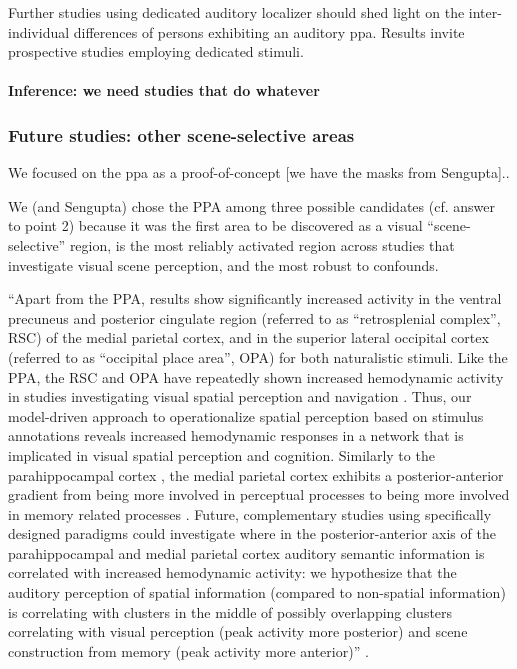 %
Further studies using dedicated auditory localizer should shed light on the
inter-individual differences of persons exhibiting an auditory \ac{ppa}.
%
Results invite prospective studies employing dedicated stimuli.



\paragraph{Inference: we need studies that do whatever}




\subsubsection{Future studies: other scene-selective areas}


We focused on the \ac{ppa} as a proof-of-concept [we have the masks from
Sengupta]..

%
We (and Sengupta) chose the PPA among three possible candidates (cf. answer to
point 2) because it was the first area to be discovered as a visual
“scene-selective” region, is the most reliably activated region across studies
that investigate visual scene perception, and the most robust to confounds.

``Apart from the PPA, results show significantly increased activity in the
ventral precuneus and posterior cingulate region (referred to as ``retrosplenial
complex'', RSC) of the medial parietal cortex, and in the superior lateral
occipital cortex (referred to as ``occipital place area'', OPA) for both
naturalistic stimuli.
Like the PPA, the RSC and OPA have repeatedly shown increased hemodynamic
activity in studies investigating visual spatial perception and navigation
\citep{chrastil2018heterogeneity, bettencourt2013role, dilks2013occipital,
epstein2019scene}.
Thus, our model-driven approach to operationalize spatial perception based on
stimulus annotations reveals increased hemodynamic responses in a network that
is implicated in visual spatial perception and cognition.
Similarly to the parahippocampal cortex \citep{aminoff2013role}, the medial
parietal cortex exhibits a posterior-anterior gradient from being more involved
in perceptual processes to being more involved in memory related processes
\citep{chrastil2018heterogeneity, hassabis2009construction, silson2019posterior,
steel2021network}.
Future, complementary studies using specifically designed paradigms could
investigate where in the posterior-anterior axis of the parahippocampal and
medial parietal cortex auditory semantic information is correlated with
increased hemodynamic activity:
we hypothesize that the auditory perception of spatial information (compared to
non-spatial information) is correlating with clusters in the middle of possibly
overlapping clusters correlating with visual perception (peak activity more
posterior) and scene construction from memory (peak activity more anterior)''
\citep{haeusler2022processing}.



